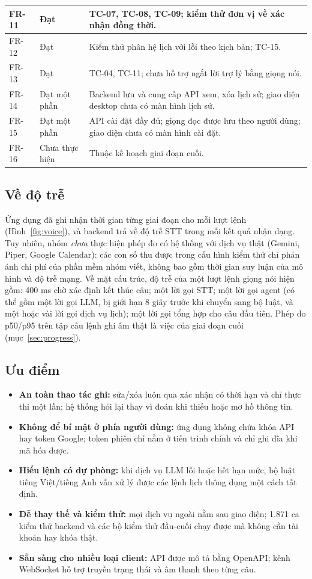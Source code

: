 {\begin{longtable}{|C{1.4cm}|C{2.5cm}|L{10.77cm}|}
FR-11 & Đạt & TC-07, TC-08, TC-09; kiểm thử đơn vị về xác nhận đồng thời.\\\hline
FR-12 & Đạt & Kiểm thử phân hệ lịch với lỗi theo kịch bản; TC-15.\\\hline
FR-13 & Đạt & TC-04, TC-11; chưa hỗ trợ ngắt lời trợ lý bằng giọng nói.\\\hline
FR-14 & Đạt một phần & Backend lưu và cung cấp API xem, xóa lịch sử; giao diện desktop chưa có màn hình lịch sử.\\\hline
FR-15 & Đạt một phần & API cài đặt đầy đủ; giọng đọc được lưu theo người dùng; giao diện chưa có màn hình cài đặt.\\\hline
FR-16 & Chưa thực hiện & Thuộc kế hoạch giai đoạn cuối.\\\hline
\end{longtable}}

\subsection{Về độ trễ}
Ứng dụng đã ghi nhận thời gian từng giai đoạn cho mỗi lượt lệnh (Hình~\ref{fig:voice}), và backend trả về độ trễ STT trong mỗi kết quả nhận dạng. Tuy nhiên, nhóm \textit{chưa} thực hiện phép đo có hệ thống với dịch vụ thật (Gemini, Piper, Google Calendar): các con số thu được trong cấu hình kiểm thử chỉ phản ánh chi phí của phần mềm nhóm viết, không bao gồm thời gian suy luận của mô hình và độ trễ mạng. Về mặt cấu trúc, độ trễ của một lượt lệnh giọng nói hiện gồm: 400 ms chờ xác định kết thúc câu; một lời gọi STT; một lời gọi agent (có thể gồm một lời gọi LLM, bị giới hạn 8 giây trước khi chuyển sang bộ luật, và một hoặc vài lời gọi dịch vụ lịch); một lời gọi tổng hợp cho câu đầu tiên. Phép đo p50/p95 trên tập câu lệnh ghi âm thật là việc của giai đoạn cuối (mục~\ref{sec:progress}).

\subsection{Ưu điểm}
\begin{itemize}
  \item \textbf{An toàn thao tác ghi:} sửa/xóa luôn qua xác nhận có thời hạn và chỉ thực thi một lần; hệ thống hỏi lại thay vì đoán khi thiếu hoặc mơ hồ thông tin.
  \item \textbf{Không để bí mật ở phía người dùng:} ứng dụng không chứa khóa API hay token Google; token phiên chỉ nằm ở tiến trình chính và chỉ ghi đĩa khi mã hóa được.
  \item \textbf{Hiểu lệnh có dự phòng:} khi dịch vụ LLM lỗi hoặc hết hạn mức, bộ luật tiếng Việt/tiếng Anh vẫn xử lý được các lệnh lịch thông dụng một cách tất định.
  \item \textbf{Dễ thay thế và kiểm thử:} mọi dịch vụ ngoài nằm sau giao diện; 1.871 ca kiểm thử backend và các bộ kiểm thử đầu-cuối chạy được mà không cần tài khoản hay khóa thật.
  \item \textbf{Sẵn sàng cho nhiều loại client:} API được mô tả bằng OpenAPI; kênh WebSocket hỗ trợ truyền trạng thái và âm thanh theo từng câu.
\end{itemize}

